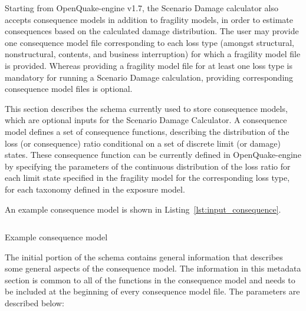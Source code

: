 Starting from OpenQuake-engine v1.7, the Scenario Damage calculator also
accepts \glspl{consequence model} in addition to \glspl{fragility model}, in
order to estimate consequences based on the calculated damage distribution.
The user may provide one \gls{consequence model} file corresponding to each
loss type (amongst structural, nonstructural, contents, and business
interruption) for which a fragility model file is provided. Whereas providing
a \gls{fragility model} file for at least one loss type is mandatory for
running a Scenario Damage calculation, providing corresponding
\gls{consequence model} files is optional.

This section describes the schema currently used to store \glspl{consequence
model}, which are optional inputs for the Scenario Damage Calculator. A
\gls{consequence model} defines a set of \glspl{consequence function},
describing the distribution of the loss (or consequence) ratio conditional on
a set of discrete limit (or damage) states. These \gls{consequence function}
can be currently defined in OpenQuake-engine by specifying the parameters of
the continuous distribution of the loss ratio for each limit state specified
in the fragility model for the corresponding loss type, for each taxonomy
defined in the exposure model.

An example consequence model is shown in Listing~\ref{lst:input_consequence}.

\begin{listing}[htbp]
  \inputminted[firstline=1,firstnumber=1,fontsize=\footnotesize,frame=single,linenos,bgcolor=lightgray]{xml}{oqum/risk/Verbatim/input_consequence.xml}
  \caption{Example consequence model}
  \label{lst:input_consequence}
\end{listing}	

The initial portion of the schema contains general information that describes
some general aspects of the \gls{consequence model}. The information in this
metadata section is common to all of the functions in the \gls{consequence
model} and needs to be included at the beginning of every \gls{consequence
model} file. The parameters are described below:

